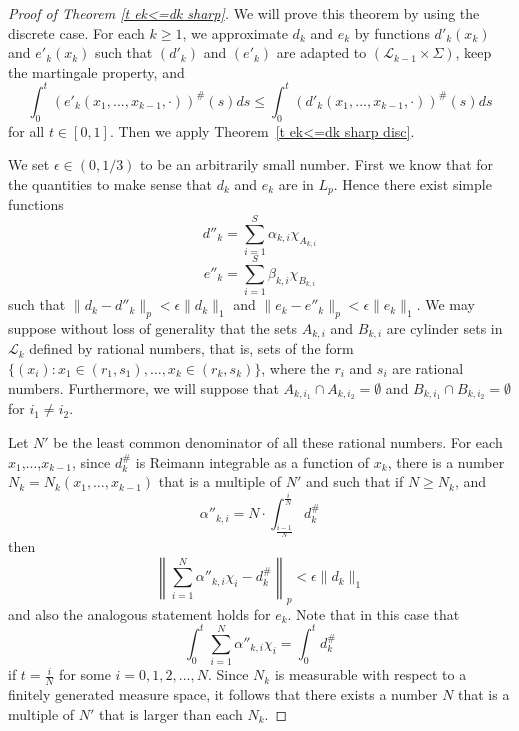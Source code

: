 \documentclass[12pt]{amsart}
\begin{document}
\begin{proof}[Proof of Theorem \ref{t ek<=dk sharp}]
We will prove this theorem by using the discrete case. For
each $k\geq 1$, we approximate
$d_k$ and $e_k$ by functions $d'_k(x_k)$ and
$e'_k(x_k)$ such that $(d'_k)$ and $(e'_k)$ are adapted
to $(\mathcal{L}_{k-1}\times\Sigma)$, keep the martingale
property, and 
\[\int_0^t (e'_k(x_1,...,x_{k-1},\cdot))^{\#}(s)ds \leq \int_0^t  (d'_k(x_1,...,x_{k-1},\cdot))^{\#}(s)ds\]
for all $t\in [0,1]$. Then we apply
Theorem~\ref{t ek<=dk sharp disc}.

We set $\epsilon \in (0,1/3)$ to be an arbitrarily small number.
First we know that for the quantities to make sense that $d_k$ and $e_k$ 
are in $L_p$.  Hence there exist simple functions
\[d''_k=\sum_{i=1}^S \alpha _{k,i}\chi _{A_{k,i}}\]
\[e''_k=\sum_{i=1}^S \beta _{k,i}\chi _{B_{k,i}}\]
such that $\|d_k-d''_k\|_p < \epsilon \|d_k\|_1$ 
and $\|e_k-e''_k\|_p < \epsilon \|e_k\|_1$.
We may suppose without loss of generality that the sets $A_{k,i}$ and
$B_{k,i}$ are cylinder sets in $\mathcal L_k$ defined by rational numbers,
that is, sets of the form 
$\{(x_i): x_1 \in (r_1,s_1),\dots,x_k \in (r_k,s_k)\}$, where the $r_i$ and
$s_i$ are rational numbers.  Furthermore, we will suppose that 
$A_{k,i_1} \cap A_{k,i_2} = \emptyset$ and
$B_{k,i_1} \cap B_{k,i_2} = \emptyset$ for $i_1 \ne i_2$.

Let $N'$ be the least common denominator of all these
rational numbers.  For each $x_1$,...,$x_{k-1}$, since 
$d_k^\#$ is Reimann integrable as a function of $x_k$, there is a
number $N_k = N_k(x_1,\dots,x_{k-1})$ that is a multiple of $N'$ and such
that if $N \ge N_k$, and 
\begin{equation}
\label{alpha''}
\alpha''_{k,i}=N \cdot \int_{\frac{i-1}{N}}^{\frac{i}{N}} d_k^\#
\end{equation}
then
\begin{equation}
\label{approx-4}
\left\|\sum_{i=1}^N \alpha''_{k,i}\chi_i -d^\#_k \right\|_p <
\epsilon\|d_k\|_1
\end{equation}
and also the analogous statement holds for $e_k$.
Note that in this case that
\[
\int_0^t \sum_{i=1}^N \alpha''_{k,i}\chi _i=\int_0^t d_k^\#
\]
if $t=\frac{i}{N}$ for some $i=0,1,2,...,N$.
Since $N_k$ is measurable with respect to a finitely generated measure
space, it follows that there exists a number $N$ that is a multiple of 
$N'$ that is larger than each $N_k$.


\end{proof}
\end{document}

